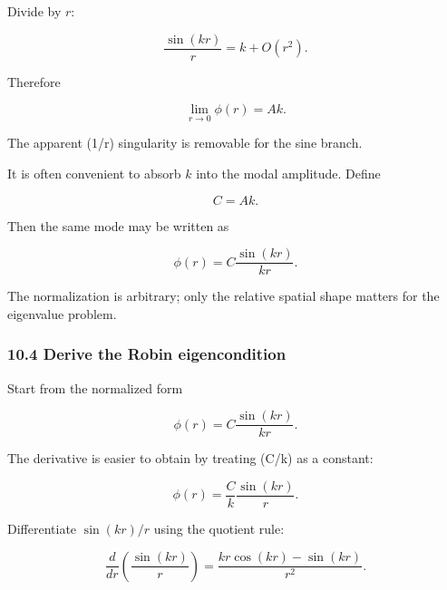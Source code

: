 \documentclass[11pt,a4paper]{article}
\begin{document}
Divide by $r$:

\begin{equation}
\frac{\sin(kr)}{r}
=
k+O(r^2).
\tag{TRISO-ANA-276}
\label{eq:triso-ana-276}
\end{equation}

Therefore

\begin{equation}
\boxed{
\lim_{r\to0}\phi(r)=Ak.
}
\tag{TRISO-ANA-277}
\label{eq:triso-ana-277}
\end{equation}

The apparent (1/r) singularity is removable for the sine branch.

It is often convenient to absorb $k$ into the modal amplitude. Define

\begin{equation}
C=A k.
\tag{TRISO-ANA-278}
\label{eq:triso-ana-278}
\end{equation}

Then the same mode may be written as

\begin{equation}
\phi(r)=C\frac{\sin(kr)}{kr}.
\tag{TRISO-ANA-279}
\label{eq:triso-ana-279}
\end{equation}

The normalization is arbitrary; only the relative spatial shape matters for the eigenvalue problem.

\subsubsection*{10.4 Derive the Robin eigencondition}

Start from the normalized form

\begin{equation}
\phi(r)=C\frac{\sin(kr)}{kr}.
\tag{TRISO-ANA-280}
\label{eq:triso-ana-280}
\end{equation}

The derivative is easier to obtain by treating (C/k) as a constant:

\begin{equation}
\phi(r)=\frac{C}{k}\frac{\sin(kr)}{r}.
\tag{TRISO-ANA-281}
\label{eq:triso-ana-281}
\end{equation}

Differentiate $\sin(kr)/r$ using the quotient rule:

\begin{equation}
\frac{d}{dr}
\left(
\frac{\sin(kr)}{r}
\right)
=
\frac{
kr\cos(kr)-\sin(kr)
}{
r^2
}.
\tag{TRISO-ANA-282}
\label{eq:triso-ana-282}
\end{equation}
\end{document}
